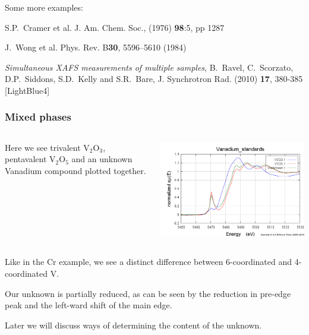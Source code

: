 \documentclass[10pt, xcolor=x11names, compress]{beamer}
\begin{document}
\begin{frame}
  Some more examples:
  \begin{description}[Mo]
  \item[Mo] S.P.\ Cramer et al. J. Am. Chem. Soc., (1976) \textbf{98}:5, pp
    1287
  \item[V] J.\ Wong et al. Phys. Rev. B\textbf{30}, 5596--5610 (1984) 
  \end{description}

    
  \begin{bottomnote}[0.5][19]
    \textit{Simultaneous XAFS measurements of multiple samples},
    B.\ Ravel, C.\ Scorzato, D.P.\ Siddons, S.D.\ Kelly and S.R.\ Bare,
    J. Synchrotron Rad. (2010) \textbf{17}, 380-385
    [LightBlue4]
  \end{bottomnote}
\end{frame}

\begin{frame}
  \frametitle{Mixed phases}

  \begin{columns}
    \begin{column}{0.4\linewidth}
      Here we see {\color{Blue3}trivalent V$_2$O$_3$},
      {\color{Red2}pentavalent V$_2$O$_5$} and an
      {\color{Green4}unknown Vanadium compound} plotted together.
    \end{column}
    \begin{column}{0.6\linewidth}
      \includegraphics[width=\linewidth]{images/V.png}
    \end{column}
  \end{columns}

  \bigskip
  
  Like in the Cr example, we see a distinct difference between
  6-coordinated and 4-coordinated V.

  \bigskip

  Our unknown is partially reduced, as can be seen by the reduction in
  pre-edge peak and the left-ward shift of the main edge.

  \bigskip

  Later we will discuss ways of determining the content of the
  unknown.
\end{frame}
\end{document}
